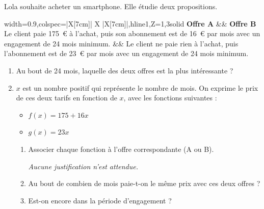 Lola souhaite acheter un smartphone. Elle étudie deux propositions.

\begin{center}
	\begin{tblr}{width=0.9\linewidth,colspec={|X[7cm]| X |X[7cm]|},hline{1,Z}={1,3}{solid}}
		\textbf{Offre A} && \textbf{Offre B} \\
		Le client paie 175~\euro{} à l'achat, puis son abonnement est de 16~\euro{} par mois avec un engagement de 24 mois minimum. &&
		Le client ne paie rien à l'achat, puis l'abonnement est de 23~\euro{} par mois avec un engagement de 24 mois minimum.
	\end{tblr}
\end{center}

\begin{enumerate}
	\item Au bout de 24 mois, laquelle des deux offres est la plus intéressante ?
	\item $x$ est un nombre positif qui représente le nombre de mois. On exprime le prix de ces deux tarifs en fonction de $x$, avec les fonctions suivantes :

	\begin{itemize}
		\item $f(x) = 175 + 16x$
		\item $g(x) = 23x$
	\end{itemize}

	\begin{enumerate}[label={\textbf{\alph*.}}]
		\item Associer chaque fonction à l'offre correspondante (A ou B).

		\emph{Aucune justification n'est attendue.}
		\item Au bout de combien de mois paie-t-on le même prix avec ces deux offres ?
		\item Est-on encore dans la période d'engagement ?
	\end{enumerate}
\end{enumerate}
